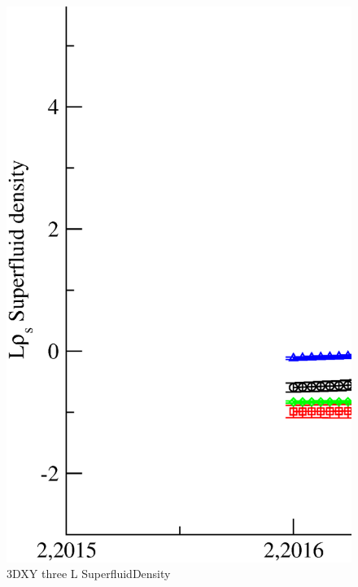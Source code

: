 \begin{figure}[!htpb]
  \centering
  \includegraphics[width=\textwidth]{./plots/3DXY/vsO/three_L_SuperfluidDensity.eps}
  \caption{3DXY three L SuperfluidDensity}
\end{figure}

